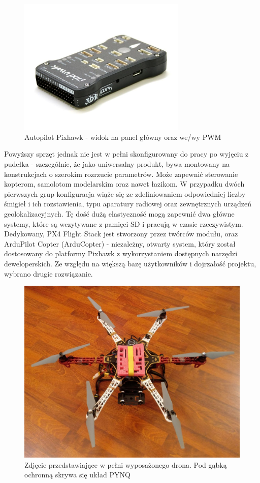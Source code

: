 \begin{figure}[h]
	\centering
	\includegraphics[width=8cm]{5_pixhawk.jpg}
	\caption{Autopilot Pixhawk - widok na panel główny oraz we/wy PWM}
	\label{fig:pixhawk}
\end{figure}

Powyższy sprzęt jednak nie jest w pełni skonfigurowany do pracy po wyjęciu z pudełka - szczególnie, że jako uniwersalny produkt, bywa montowany na konstrukcjach o szerokim rozrzucie parametrów. Może zapewnić sterowanie kopterom, samolotom modelarskim oraz nawet łazikom. W przypadku dwóch pierwszych grup konfiguracja wiąże się ze zdefiniowaniem odpowiedniej liczby śmigieł i ich rozstawienia, typu aparatury radiowej oraz zewnętrznych urządzeń geolokalizacyjnych. Tę dość dużą elastyczność mogą zapewnić dwa główne systemy, które są wczytywane z pamięci SD i pracują w czasie rzeczywistym. Dedykowany, PX4 Flight Stack jest stworzony przez twórców modułu, oraz ArduPilot Copter (ArduCopter) - niezależny, otwarty system, który został dostosowany do platformy Pixhawk z wykorzystaniem dostępnych narzędzi deweloperskich. Ze względu na większą bazę użytkowników i dojrzałość projektu, wybrano drugie rozwiązanie.

\begin{figure}[h]
	\centering
	\captionsetup{justification=centering,margin=1cm}
	\hspace*{0cm}
	\includegraphics[width=14cm]{5_drone_photo.jpg}
	\caption{Zdjęcie przedstawiające w pełni wyposażonego drona. Pod gąbką ochronną skrywa się układ PYNQ}
	\label{fig:architecture}
\end{figure}

